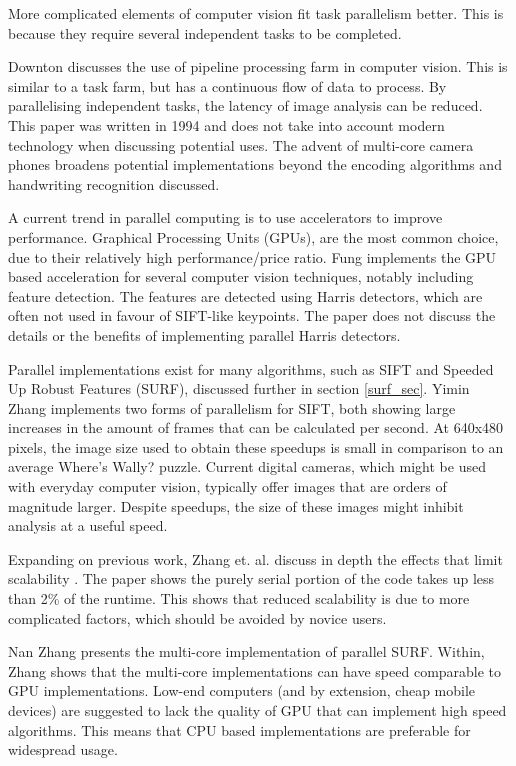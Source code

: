 \documentclass[../main.tex]{subfiles}
\begin{document}
    More complicated elements of computer vision fit task parallelism better.
    This is because they require several independent tasks to be completed.
    
    Downton\cite{downton} discusses the use of pipeline processing farm in computer vision.
    This is similar to a task farm, but has a continuous flow of data to process.
    By parallelising independent tasks, the latency of image analysis can be reduced.
    This paper was written in 1994 and does not take into account modern technology when discussing potential uses.
    The advent of multi-core camera phones broadens potential implementations beyond the encoding algorithms and handwriting recognition discussed.
    
    A current trend in parallel computing is to use accelerators to improve performance.
    Graphical Processing Units (GPUs), are the most common choice, due to their relatively high performance/price ratio.
    Fung\cite{gpuvision} implements the GPU based acceleration for several computer vision techniques, notably including feature detection.
    The features are detected using Harris detectors, which are often not used in favour of SIFT-like keypoints.
    The paper does not discuss the details or the benefits of implementing parallel Harris detectors.

    Parallel implementations exist for many algorithms, such as SIFT and Speeded Up Robust Features (SURF), discussed further in section \ref{surf_sec}.
    Yimin Zhang\cite{zhangsift} implements two forms of parallelism for SIFT, both showing large increases in the amount of frames that can be calculated per second.
    At 640x480 pixels, the image size used to obtain these speedups is small in comparison to an average Where's Wally? puzzle.
    Current digital cameras, which might be used with everyday computer vision, typically offer images that are orders of magnitude larger.
    Despite speedups, the size of these images might inhibit analysis at a useful speed.

    Expanding on previous work, Zhang et. al. discuss in depth the effects that limit scalability \cite{fengparallelization}.
    The paper shows the purely serial portion of the code takes up less than 2\% of the runtime.
    This shows that reduced scalability is due to more complicated factors, which should be avoided by novice users.
    
    Nan Zhang presents the multi-core implementation of parallel SURF\cite{parallelCPUSURF}.
    Within, Zhang shows that the multi-core implementations can have speed comparable to GPU implementations.
    Low-end computers (and by extension, cheap mobile devices) are suggested to lack the quality of GPU that can implement high speed algorithms.
    This means that CPU based implementations are preferable for widespread usage.
    
\end{document}
